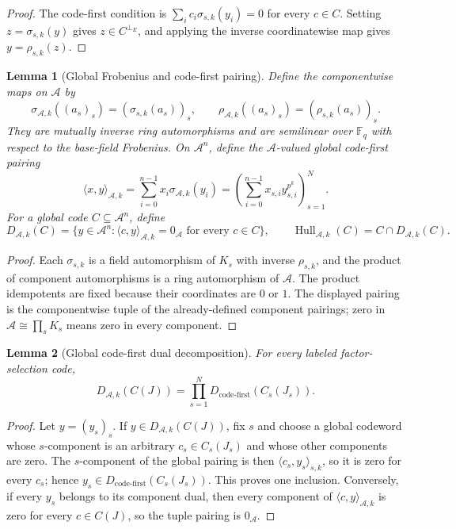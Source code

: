 \documentclass[11pt]{article}
\newcommand{\F}{\mathbb F}
\newcommand{\A}{\mathcal A}
\newcommand{\Hull}{\operatorname{Hull}}
\newcommand{\perpE}{\perp_E}
\newcommand{\CF}{\mathrm{code\text{-}first}}
\theoremstyle{plain}
\newtheorem{lemma}{Lemma}
\theoremstyle{definition}
\theoremstyle{remark}
\begin{document}
\begin{proof}
The code-first condition is $\sum_i c_i\sigma_{s,k}(y_i)=0$ for every $c\in C$. Setting $z=\sigma_{s,k}(y)$ gives $z\in C^{\perpE}$, and applying the inverse coordinatewise map gives $y=\rho_{s,k}(z)$.
\end{proof}

\begin{lemma}[Global Frobenius and code-first pairing]\label{lem:global-pairing}
Define the componentwise maps on $\A$ by
\[
\sigma_{\A,k}((a_s)_s)=(\sigma_{s,k}(a_s))_s,
\qquad
\rho_{\A,k}((a_s)_s)=(\rho_{s,k}(a_s))_s.
\]
They are mutually inverse ring automorphisms and are semilinear over $\F_q$ with respect to the base-field Frobenius. On $\A^n$, define the $\A$-valued global code-first pairing
\[
\langle x,y\rangle_{\A,k}
 =\sum_{i=0}^{n-1}x_i\sigma_{\A,k}(y_i)
 =\left(\sum_{i=0}^{n-1}x_{s,i}y_{s,i}^{p^k}\right)_{s=1}^{N}.
\]
For a global code $C\subseteq\A^n$, define
\[
D_{\A,k}(C)=\{y\in\A^n:\langle c,y\rangle_{\A,k}=0_{\A}\text{ for every }c\in C\},
\qquad
\Hull_{\A,k}(C)=C\cap D_{\A,k}(C).
\]
\end{lemma}

\begin{proof}
Each $\sigma_{s,k}$ is a field automorphism of $K_s$ with inverse $\rho_{s,k}$, and the product of component automorphisms is a ring automorphism of $\A$. The product idempotents are fixed because their coordinates are $0$ or $1$. The displayed pairing is the componentwise tuple of the already-defined component pairings; zero in $\A\cong\prod_sK_s$ means zero in every component.
\end{proof}

\begin{lemma}[Global code-first dual decomposition]\label{lem:global-dual}
For every labeled factor-selection code,
\[
D_{\A,k}(C(J))
 =\prod_{s=1}^{N}D_{\CF}(C_s(J_s)).
\]
\end{lemma}

\begin{proof}
Let $y=(y_s)_s$. If $y\in D_{\A,k}(C(J))$, fix $s$ and choose a global codeword whose $s$-component is an arbitrary $c_s\in C_s(J_s)$ and whose other components are zero. The $s$-component of the global pairing is then $\langle c_s,y_s\rangle_{s,k}$, so it is zero for every $c_s$; hence $y_s\in D_{\CF}(C_s(J_s))$. This proves one inclusion. Conversely, if every $y_s$ belongs to its component dual, then every component of $\langle c,y\rangle_{\A,k}$ is zero for every $c\in C(J)$, so the tuple pairing is $0_{\A}$.
\end{proof}
\end{document}
